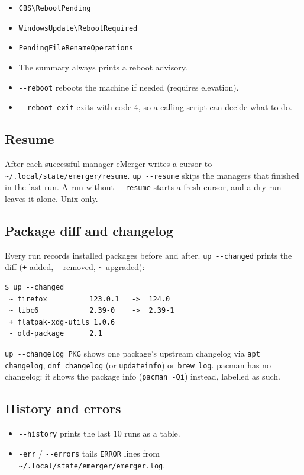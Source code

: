 \documentclass[11pt,a4paper]{article}
\begin{document}
\begin{itemize}
  \item \texttt{CBS\textbackslash RebootPending}
  \item \texttt{WindowsUpdate\textbackslash RebootRequired}
  \item \texttt{PendingFileRenameOperations}
\end{itemize}

\begin{itemize}
  \item The summary always prints a reboot advisory.
  \item \texttt{-{}-reboot} reboots the machine if needed (requires
        elevation).
  \item \texttt{-{}-reboot-exit} exits with code 4, so a calling script
        can decide what to do.
\end{itemize}

\subsection{Resume}
After each successful manager eMerger writes a cursor to
\verb|~/.local/state/emerger/resume|. \texttt{up -{}-resume} skips the
managers that finished in the last run. A run without
\texttt{-{}-resume} starts a fresh cursor, and a dry run leaves it alone.
Unix only.

\subsection{Package diff and changelog}
Every run records installed packages before and after. \texttt{up
-{}-changed} prints the diff (\texttt{+} added, \texttt{-} removed,
\texttt{\~} upgraded):

\begin{lstlisting}[basicstyle=\ttfamily\footnotesize]
$ up --changed
 ~ firefox          123.0.1   ->  124.0
 ~ libc6            2.39-0    ->  2.39-1
 + flatpak-xdg-utils 1.0.6
 - old-package      2.1
\end{lstlisting}

\texttt{up -{}-changelog PKG} shows one package's upstream changelog via
\texttt{apt changelog}, \texttt{dnf changelog} (or \texttt{updateinfo})
or \texttt{brew log}. pacman has no changelog: it shows the package info
(\texttt{pacman -Qi}) instead, labelled as such.

\subsection{History and errors}
\begin{itemize}
  \item \texttt{-{}-history} prints the last 10 runs as a table.
  \item \texttt{-err} / \texttt{-{}-errors} tails \texttt{ERROR} lines from
        \verb|~/.local/state/emerger/emerger.log|.
\end{itemize}
\end{document}
